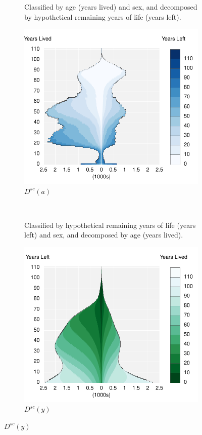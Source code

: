 \documentclass{article}
\begin{document}
\begin{figure}
\centering
\caption{Deaths from external causes in the USA, 2010}
\label{fig:3}
\begin{subfigure}[b]{.48\linewidth}
\centering
	\caption{Classified by age (years lived) and sex, and decomposed
by hypothetical remaining years of life (years left).}
	\label{fig:Dayc}
	\includegraphics[scale=.55]{Figures/Deathsxy10USAExternal.pdf}	
	\caption*{$D^{sc}(a)$}
\end{subfigure}
~
\begin{subfigure}[b]{.48\linewidth}
\centering
    \caption{Classified by hypothetical remaining years of life
(years left) and sex, and decomposed by age (years lived).}
	\label{fig:Dyac}
    \includegraphics[scale=.55]{Figures/Deathsyx10USAExternal.pdf}
    \caption*{$D^{sc}(y)$ }
\end{subfigure}
\end{figure}
\end{document}
